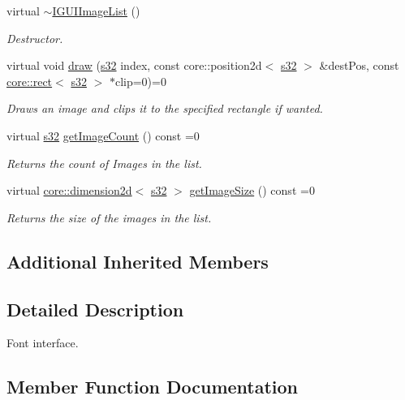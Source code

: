 \begin{DoxyCompactItemize}
virtual \hyperlink{classirr_1_1gui_1_1IGUIImageList_ad6be754893f7ba902d821d215761075f}{$\sim$\+I\+G\+U\+I\+Image\+List} ()
\begin{DoxyCompactList}\small\item\em Destructor. \end{DoxyCompactList}\item 
virtual void \hyperlink{classirr_1_1gui_1_1IGUIImageList_ae19fa00cece01c5914dfc0a3e33a882c}{draw} (\hyperlink{namespaceirr_ac66849b7a6ed16e30ebede579f9b47c6}{s32} index, const core\+::position2d$<$ \hyperlink{namespaceirr_ac66849b7a6ed16e30ebede579f9b47c6}{s32} $>$ \&dest\+Pos, const \hyperlink{classirr_1_1core_1_1rect}{core\+::rect}$<$ \hyperlink{namespaceirr_ac66849b7a6ed16e30ebede579f9b47c6}{s32} $>$ $\ast$clip=0)=0
\begin{DoxyCompactList}\small\item\em Draws an image and clips it to the specified rectangle if wanted. \end{DoxyCompactList}\item 
virtual \hyperlink{namespaceirr_ac66849b7a6ed16e30ebede579f9b47c6}{s32} \hyperlink{classirr_1_1gui_1_1IGUIImageList_a1cc8626cacd608f343d103394423753e}{get\+Image\+Count} () const =0
\begin{DoxyCompactList}\small\item\em Returns the count of Images in the list. \end{DoxyCompactList}\item 
virtual \hyperlink{classirr_1_1core_1_1dimension2d}{core\+::dimension2d}$<$ \hyperlink{namespaceirr_ac66849b7a6ed16e30ebede579f9b47c6}{s32} $>$ \hyperlink{classirr_1_1gui_1_1IGUIImageList_a5973353355625da76b24100f16f90539}{get\+Image\+Size} () const =0
\begin{DoxyCompactList}\small\item\em Returns the size of the images in the list. \end{DoxyCompactList}\end{DoxyCompactItemize}
\subsection*{Additional Inherited Members}


\subsection{Detailed Description}
Font interface. 

\subsection{Member Function Documentation}
\mbox{\label{classirr_1_1gui_1_1IGUIImageList_ae19fa00cece01c5914dfc0a3e33a882c}} 
